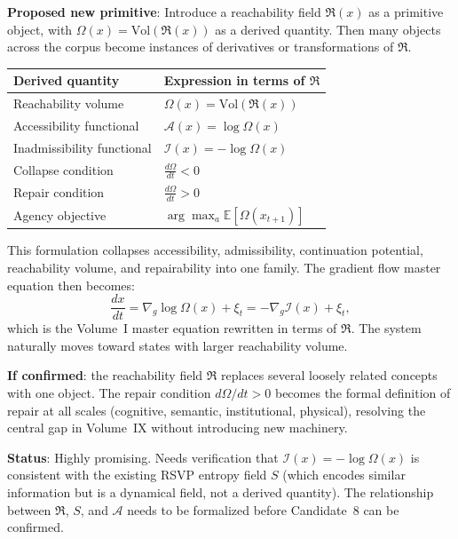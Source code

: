 \documentclass[11pt, a4paper]{article}
\begin{document}
\begin{candbox}
\textbf{Proposed new primitive}: Introduce a reachability field
$\mathfrak{R}(x)$ as a primitive object, with $\Omega(x) =
\mathrm{Vol}(\mathfrak{R}(x))$ as a derived quantity. Then many
objects across the corpus become instances of derivatives or
transformations of $\mathfrak{R}$.

\medskip
\begin{tabular}{ll}
\textbf{Derived quantity} & \textbf{Expression in terms of $\mathfrak{R}$} \\
\hline
Reachability volume & $\Omega(x) = \mathrm{Vol}(\mathfrak{R}(x))$ \\
Accessibility functional & $\mathcal{A}(x) = \log\Omega(x)$ \\
Inadmissibility functional & $\mathcal{I}(x) = -\log\Omega(x)$ \\
Collapse condition & $\frac{d\Omega}{dt} < 0$ \\
Repair condition & $\frac{d\Omega}{dt} > 0$ \\
Agency objective & $\arg\max_a \mathbb{E}[\Omega(x_{t+1})]$ \\
\end{tabular}

\medskip
This formulation collapses accessibility, admissibility, continuation
potential, reachability volume, and repairability into one family. The
gradient flow master equation then becomes:
\[
  \frac{dx}{dt} = \nabla_g \log\Omega(x) + \xi_t
  = -\nabla_g \mathcal{I}(x) + \xi_t,
\]
which is the Volume~I master equation rewritten in terms of
$\mathfrak{R}$. The system naturally moves toward states with
larger reachability volume.

\medskip
\textbf{If confirmed}: the reachability field $\mathfrak{R}$ replaces
several loosely related concepts with one object. The repair condition
$d\Omega/dt > 0$ becomes the formal definition of repair at all scales
(cognitive, semantic, institutional, physical), resolving the central
gap in Volume~IX without introducing new machinery.

\medskip
\textbf{Status}: Highly promising. Needs verification that
$\mathcal{I}(x) = -\log\Omega(x)$ is consistent with the existing
RSVP entropy field $S$ (which encodes similar information but is a
dynamical field, not a derived quantity). The relationship between
$\mathfrak{R}$, $S$, and $\mathcal{A}$ needs to be formalized before
Candidate~8 can be confirmed.
\end{candbox}

\end{document}

